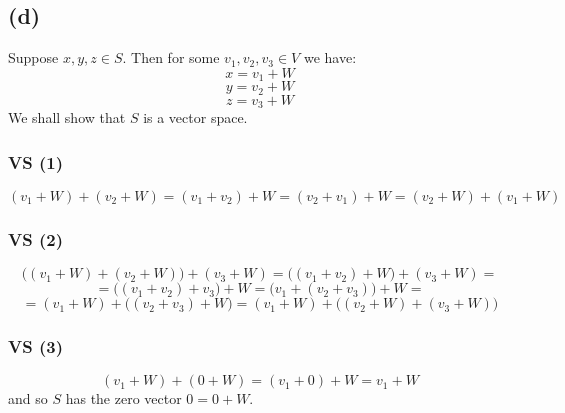 \documentclass{article}
\begin{document}
\subsection*{(d)}

Suppose \(x, y, z \in S\). Then for some \(v_{1}, v_{2}, v_{3} \in V\) we have:
\begin{equation*}
    x = v_{1} + W
\end{equation*}
\begin{equation*}
    y = v_{2} + W
\end{equation*}
\begin{equation*}
    z = v_{3} + W
\end{equation*}
We shall show that \(S\) is a vector space.

\subsubsection*{VS (1)}

\begin{equation*}
    (v_{1} + W) + (v_{2} + W) = (v_{1} + v_{2}) + W = (v_{2} + v_{1}) + W = (v_{2} + W) + (v_{1} + W)
\end{equation*}

\subsubsection*{VS (2)}

\begin{equation*}
    \Big( (v_{1} + W) + (v_{2} + W) \Big) + (v_{3} + W) = \Big( (v_{1} + v_{2}) + W \Big) + (v_{3} + W) =
\end{equation*}
\begin{equation*}
    = \Big( (v_{1} + v_{2}) + v_{3} \Big) + W = \Big( v_{1} + (v_{2} + v_{3}) \Big) + W = 
\end{equation*}
\begin{equation*}
    = (v_{1} + W) + \Big( (v_{2} + v_{3}) + W \Big) = (v_{1} + W) + \Big( (v_{2} + W) + (v_{3} + W) \Big)
\end{equation*}

\subsubsection*{VS (3)}

\begin{equation*}
    (v_{1} + W) + (0 + W) = (v_{1} + 0) + W = v_{1} + W
\end{equation*}
and so \(S\) has the zero vector \(0 = 0 + W\).
\end{document}
